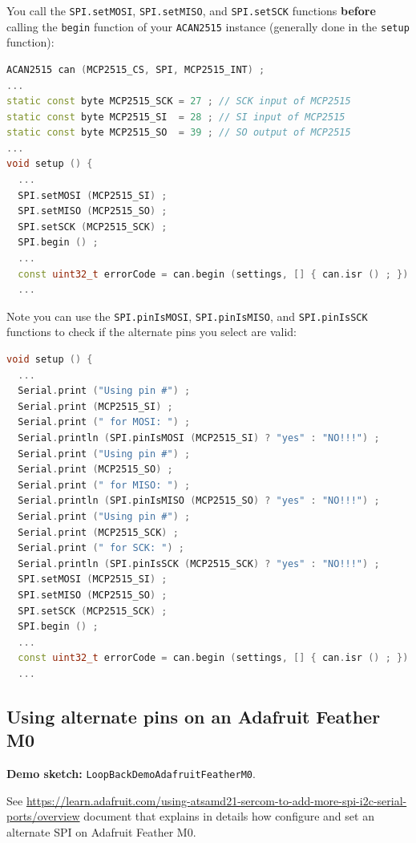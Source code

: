 \documentclass[10pt, a4paper, obeyspaces, openany]{extarticle}
\newcommand \subsectionLabel[2]{\subsection{#1}\label{subsec:#2}}
\begin{document}
You call the \texttt{SPI.setMOSI}, \texttt{SPI.setMISO}, and \texttt{SPI.setSCK} functions \textbf{before} calling the \texttt{begin} function of your \texttt{ACAN2515} instance (generally done in the \texttt{setup} function):
{ \small\begin{lstlisting}[language=c++]
ACAN2515 can (MCP2515_CS, SPI, MCP2515_INT) ;
...
static const byte MCP2515_SCK = 27 ; // SCK input of MCP2515 
static const byte MCP2515_SI  = 28 ; // SI input of MCP2515  
static const byte MCP2515_SO  = 39 ; // SO output of MCP2515 
...
void setup () {
  ...
  SPI.setMOSI (MCP2515_SI) ;
  SPI.setMISO (MCP2515_SO) ;
  SPI.setSCK (MCP2515_SCK) ;
  SPI.begin () ;
  ...
  const uint32_t errorCode = can.begin (settings, [] { can.isr () ; }) ;
  ...
\end{lstlisting}}

Note you can use the \texttt{SPI.pinIsMOSI}, \texttt{SPI.pinIsMISO}, and \texttt{SPI.pinIsSCK} functions to check if the alternate pins you select are valid:
{ \small\begin{lstlisting}[language=c++]
void setup () {
  ...
  Serial.print ("Using pin #") ;
  Serial.print (MCP2515_SI) ;
  Serial.print (" for MOSI: ") ;
  Serial.println (SPI.pinIsMOSI (MCP2515_SI) ? "yes" : "NO!!!") ;
  Serial.print ("Using pin #") ;
  Serial.print (MCP2515_SO) ;
  Serial.print (" for MISO: ") ;
  Serial.println (SPI.pinIsMISO (MCP2515_SO) ? "yes" : "NO!!!") ;
  Serial.print ("Using pin #") ;
  Serial.print (MCP2515_SCK) ;
  Serial.print (" for SCK: ") ;
  Serial.println (SPI.pinIsSCK (MCP2515_SCK) ? "yes" : "NO!!!") ;
  SPI.setMOSI (MCP2515_SI) ;
  SPI.setMISO (MCP2515_SO) ;
  SPI.setSCK (MCP2515_SCK) ;
  SPI.begin () ;
  ...
  const uint32_t errorCode = can.begin (settings, [] { can.isr () ; }) ;
  ...
\end{lstlisting}}




\subsectionLabel{Using alternate pins on an Adafruit Feather M0}{AdafruitFeatherM0AlternatePins}

{\bf Demo sketch: } \texttt{LoopBackDemoAdafruitFeatherM0}.

See \url{https://learn.adafruit.com/using-atsamd21-sercom-to-add-more-spi-i2c-serial-ports/overview} document that explains in details how configure and set an alternate SPI on Adafruit Feather M0.
\end{document}
